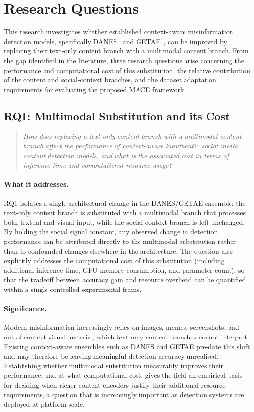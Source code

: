\section{Research Questions}
\label{sec:research_questions}

This research investigates whether established context-aware misinformation detection models, specifically DANES~\citep{truica2024danes} and GETAE~\citep{GETAE2025}, can be improved by replacing their text-only content branch with a multimodal content branch. From the gap identified in the literature, three research questions arise concerning the performance and computational cost of this substitution, the relative contribution of the content and social-context branches, and the dataset adaptation requirements for evaluating the proposed MACE framework.

\subsection*{RQ1: Multimodal Substitution and its Cost}
\label{subsec:rq1}

\begin{quote}
\emph{How does replacing a text-only content branch with a multimodal
content branch affect the performance of context-aware inauthentic
social media content detection models, and what is the associated cost
in terms of inference time and computational resource usage?}
\end{quote}

\paragraph{What it addresses.}
RQ1 isolates a single architectural change in the DANES/GETAE ensemble:
the text-only content branch is substituted with a multimodal branch
that processes both textual and visual input, while the social context
branch is left unchanged. By holding the social signal constant, any
observed change in detection performance can be attributed directly to
the multimodal substitution rather than to confounded changes elsewhere
in the architecture. The question also explicitly addresses the
computational cost of this substitution (including additional
inference time, GPU memory consumption, and parameter count), so that
the tradeoff between accuracy gain and resource overhead can be
quantified within a single controlled experimental frame.

\paragraph{Significance.}
Modern misinformation increasingly relies on images, memes,
screenshots, and out-of-context visual material, which text-only
content branches cannot interpret. Existing context-aware ensembles
such as DANES and GETAE pre-date this shift and may therefore be
leaving meaningful detection accuracy unrealised. Establishing whether
multimodal substitution measurably improves their performance, and at
what computational cost, gives the field an empirical basis for
deciding when richer content encoders justify their additional
resource requirements, a question that is increasingly important as
detection systems are deployed at platform scale.

